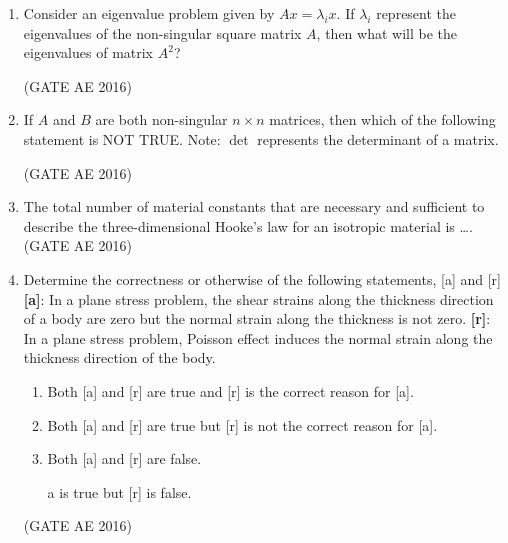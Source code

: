 \documentclass[journal,12pt,onecolumn]{IEEEtran}
\theoremstyle{remark}
\begin{document}
\begin{enumerate}
    \item Consider an eigenvalue problem given by $A x = \lambda_i x$.  
    If $\lambda_i$ represent the eigenvalues of the non-singular square matrix $A$, then what will be the eigenvalues of matrix $A^2$?  
    \begin{enumerate}
    \end{enumerate}
    \hfill(GATE AE 2016)



    \item If $A$ and $B$ are both non-singular $n \times n$ matrices, then which of the following statement is NOT TRUE.  
    Note: $\det$ represents the determinant of a matrix.  
    \begin{enumerate}
    \end{enumerate}
    \hfill(GATE AE 2016)



    \item The total number of material constants that are necessary and sufficient to describe the three-dimensional Hooke's law for an isotropic material is \dots.
\hfill(GATE AE 2016)



    \item Determine the correctness or otherwise of the following statements, [a] and [r]
    \textbf{[a]}: In a plane stress problem, the shear strains along the thickness direction of a body are zero but the normal strain along the thickness is not zero.  
    \textbf{[r]}: In a plane stress problem, Poisson effect induces the normal strain along the thickness direction of the body.  
    \begin{enumerate}
        \item Both [a] and [r] are true and [r] is the correct reason for [a].
        \item Both [a] and [r] are true but [r] is not the correct reason for [a].
        \item Both [a] and [r] are false.
        \item [a] is true but [r] is false.
    \end{enumerate}
    \hfill(GATE AE 2016)




\end{enumerate}
\end{document}
